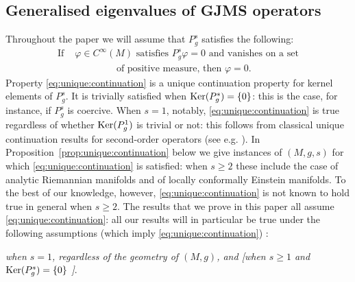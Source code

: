 \documentclass[10pt]{amsart}
\numberwithin{equation}{section}
\def\ker{{\mathop{\rm Ker}}}
\newcommand{\vp}{\varphi}
\theoremstyle{plain}
\theoremstyle{remark}
\begin{document}
 


\subsection{Generalised eigenvalues of GJMS operators}


Throughout the paper we will assume that $P_g^s$ satisfies the following: 
\begin{equation} \label{eq:unique:continuation} 
\begin{aligned}
\text{ If } & \vp \in C^\infty(M)  \text{ satisfies }  P_g^s \vp = 0 \text{ and vanishes on a set }  \\
& \qquad \qquad \text{ of positive measure, then } \vp = 0. 
\end{aligned}
\end{equation}
Property \eqref{eq:unique:continuation} is a unique continuation property for kernel elements of $P_g^s$. It is trivially satisfied when $\ker(P_g^s) = \{0\}$: this is the case, for instance, if $P_g^s $ is coercive. When $s=1$, notably, \eqref{eq:unique:continuation} is true regardless of whether $\ker(P_g^1)$ is trivial or not: this follows from classical unique continuation results for second-order operators (see e.g. \cite{HardtSimon}).  In Proposition~\ref{prop:unique:continuation} below we give instances of $(M,g,s)$ for which \eqref{eq:unique:continuation} is satisfied: when $s \ge 2$ these include the case of analytic Riemannian manifolds and of locally conformally Einstein manifolds. To the best of our knowledge, however, \eqref{eq:unique:continuation} is not known to hold true in general when $s \ge 2$. The results that we prove in this paper all assume \eqref{eq:unique:continuation}: all our results will in particular be true under the following assumptions (which imply \eqref{eq:unique:continuation}) :

\medskip

\begin{center}
 \emph{when $s=1$, regardless of the geometry of $(M,g)$, and  [when $s \ge 1$ and $\ker(P_g^s) = \{0\}$ ]}.
 \end{center}  

\medskip
\end{document}
